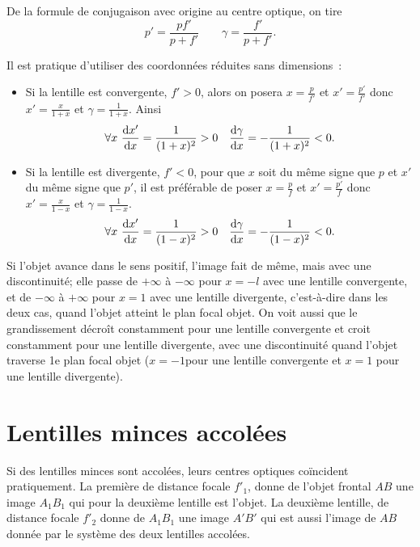 De la formule de conjugaison avec origine au centre optique, on tire 
\begin{equation}
  p' = \frac{pf'}{p+f'} \qquad \gamma = \frac{f'}{p+f'}.
\end{equation}

Il est pratique d'utiliser des coordonnées réduites sans dimensions~:
\begin{itemize}
\item Si la lentille est convergente, $f' > 0$, alors on posera $x = \frac{p}{f'}$ et $x' = \frac{p'}{f'}$ donc $x' = \frac{x}{1+x}$ et $\gamma = \frac{1}{1+x}$. Ainsi
  \begin{equation}
    \forall x \ \dfrac{\mathrm{d} x'}{\mathrm{d} x} = \frac{1}{(1+x)^2} > 0 \quad \dfrac{\mathrm{d} \gamma}{\mathrm{d} x} = - \frac{1}{(1+x)^2} < 0.
  \end{equation}
\item Si la lentille est divergente, $f' < 0$, pour que $x$ soit du même signe que $p$ et $x'$ du même signe que $p'$, il est préférable de poser $x = \frac{p}{f}$ et $x' = \frac{p'}{f}$  donc $x' = \frac{x}{1-x}$  et  $\gamma = \frac{1}{1-x}$.
  \begin{equation}
    \forall x \ \dfrac{\mathrm{d} x'}{\mathrm{d} x} = \frac{1}{(1-x)^2} > 0 \quad \dfrac{\mathrm{d} \gamma}{\mathrm{d} x} = - \frac{1}{(1-x)^2} < 0.
  \end{equation}
\end{itemize}

Si l'objet avance dans le sens positif, l'image fait de même, mais avec une discontinuité; elle passe de $+\infty$ à $-\infty$ pour $x = -l$ avec une lentille convergente, et de $-\infty$ à $+\infty$ pour $x = 1$ avec une lentille divergente, c'est-à-dire dans les deux cas, quand l'objet atteint le plan focal objet.
On voit aussi que le grandissement décroît constamment pour une lentille convergente et croit constamment pour une lentille divergente, avec une discontinuité quand l'objet traverse 1e plan focal objet ($x = -1$pour une lentille convergente et $x = 1$ pour une lentille divergente).

\section{Lentilles minces accolées}
\label{chap8-sec:lentillesmincesaccolées}

Si des 	lentilles minces sont accolées, leurs centres optiques co\"incident pratiquement. La première de distance focale $f'_1$, donne de l'objet frontal $AB$ une image $A_1B_1$ qui pour la deuxième lentille est l'objet. La deuxième lentille, de distance focale $f'_2$ donne de $A_1B_1$ une image $A'B'$ qui est aussi l'image de $AB$ donnée par le système des deux lentilles accolées.

